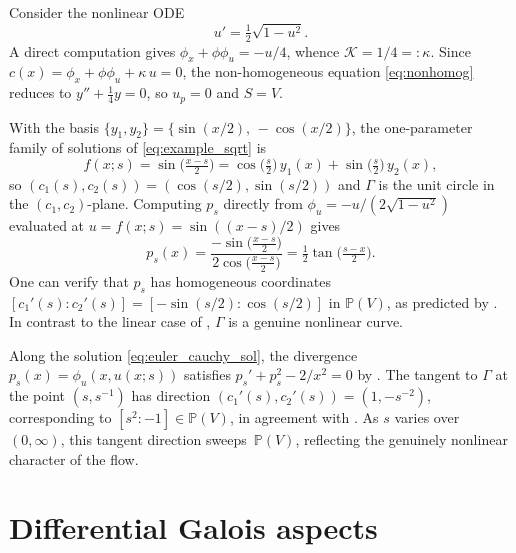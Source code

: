 \documentclass[preprint,a4paper]{elsarticle}
\begin{document}
\begin{example}\label{ex:nonlinear_proj}
Consider the nonlinear ODE
\begin{equation}\label{eq:example_sqrt}
u'=\tfrac{1}{2}\sqrt{1-u^2}.
\end{equation}
A direct computation gives $\phi_x+\phi\phi_u=-u/4$, whence $\mathcal{K}=1/4=:\kappa$. Since $c(x)=\phi_x+\phi\phi_u+\kappa\, u=0$, the non-homogeneous equation \eqref{eq:nonhomog} reduces to $y''+\frac{1}{4}y=0$, so $u_p=0$ and $S=V$.

With the basis $\{y_1,y_2\}=\{\sin(x/2),\,-\cos(x/2)\}$, the one-parameter family of solutions of \eqref{eq:example_sqrt} is
\[
f(x;s)=\sin\!\bigl(\tfrac{x-s}{2}\bigr)=\cos\!\bigl(\tfrac{s}{2}\bigr)\,y_1(x)+\sin\!\bigl(\tfrac{s}{2}\bigr)\,y_2(x),
\]
so $(c_1(s),c_2(s))=(\cos(s/2),\sin(s/2))$ and $\Gamma$ is the unit circle in the $(c_1,c_2)$-plane. Computing $p_s$ directly from $\phi_u=-u/(2\sqrt{1-u^2})$ evaluated at $u=f(x;s)=\sin((x-s)/2)$ gives
\[
p_s(x)=\frac{-\sin\!\bigl(\frac{x-s}{2}\bigr)}{2\cos\!\bigl(\frac{x-s}{2}\bigr)}=\tfrac{1}{2}\tan\!\bigl(\tfrac{s-x}{2}\bigr).
\]
One can verify that $p_s$ has homogeneous coordinates $[c_1'(s):c_2'(s)]=[-\sin(s/2):\cos(s/2)]$ in $\mathbb{P}(V)$, as predicted by . In contrast to the linear case of , $\Gamma$ is a genuine nonlinear curve.
\end{example}

\begin{example}\label{ex:euler_cauchy_proj}
Along the solution \eqref{eq:euler_cauchy_sol}, the divergence $p_s(x)=\phi_u(x,u(x;s))$ satisfies $p_s'+p_s^2-2/x^2=0$ by . 
The tangent to $\Gamma$ at the point $(s,s^{-1})$ has direction $(c_1'(s),c_2'(s))=(1,-s^{-2})$, corresponding to $[s^2:-1]\in\mathbb{P}(V)$, in agreement with . As $s$ varies over $(0,\infty)$, this tangent direction sweeps~$\mathbb{P}(V)$, reflecting the genuinely nonlinear character of the flow.
\end{example}



\section{Differential Galois aspects}\label{sec:differential_galois}
\end{document}
